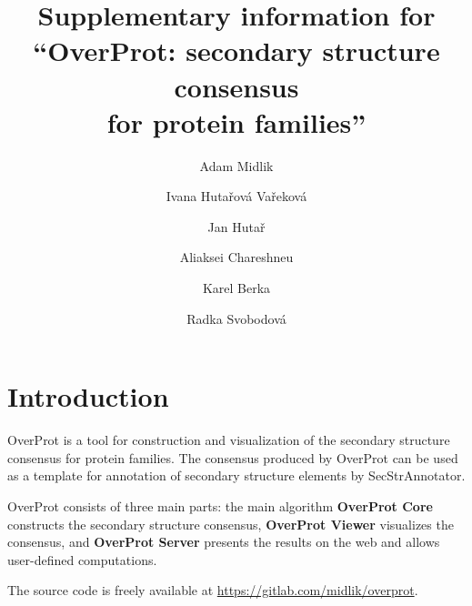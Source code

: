 \documentclass{article}
\begin{document}
\title{Supplementary information for \\ ``OverProt: secondary structure consensus \\for protein families''}

\author[1,2]{Adam Midlik}
\author[1,2,3]{Ivana Hutařová Vařeková}
\author[1,2]{Jan Hutař}
\author[1,2]{Aliaksei Chareshneu}
\author[4,*]{Karel Berka}
\author[1,2,*]{Radka Svobodová}

\date{}  %

\maketitle

\renewcommand{\contentsname}{Table of contents}
\tableofcontents
\clearpage


\section{Introduction}

OverProt is a tool for construction and visualization of the secondary
structure consensus for protein families. The consensus produced by
OverProt can be used as a template for annotation of secondary structure
elements by SecStrAnnotator.

OverProt consists of three main parts: the main algorithm
\textbf{OverProt Core} constructs the secondary structure consensus,
\textbf{OverProt Viewer} visualizes the consensus, and \textbf{OverProt
Server} presents the results on the web and allows user-defined
computations.

The source code is freely available at \url{https://gitlab.com/midlik/overprot}.
\end{document}
